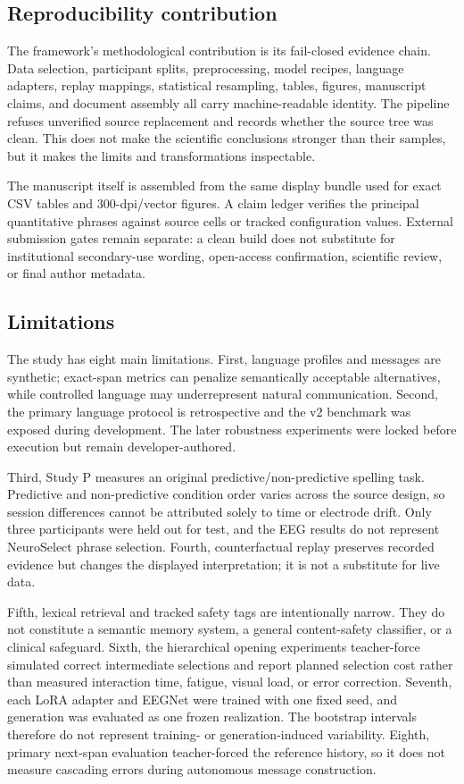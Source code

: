 \documentclass[11pt]{article}
\begin{document}
\subsection{Reproducibility contribution}

The framework's methodological contribution is its fail-closed evidence chain. Data selection, participant splits, preprocessing, model recipes, language adapters, replay mappings, statistical resampling, tables, figures, manuscript claims, and document assembly all carry machine-readable identity. The pipeline refuses unverified source replacement and records whether the source tree was clean. This does not make the scientific conclusions stronger than their samples, but it makes the limits and transformations inspectable.


The manuscript itself is assembled from the same display bundle used for exact CSV tables and 300-dpi/vector figures. A claim ledger verifies the principal quantitative phrases against source cells or tracked configuration values. External submission gates remain separate: a clean build does not substitute for institutional secondary-use wording, open-access confirmation, scientific review, or final author metadata.


\subsection{Limitations}

The study has eight main limitations. First, language profiles and messages are synthetic; exact-span metrics can penalize semantically acceptable alternatives, while controlled language may underrepresent natural communication. Second, the primary language protocol is retrospective and the v2 benchmark was exposed during development. The later robustness experiments were locked before execution but remain developer-authored.


Third, Study P measures an original predictive/non-predictive spelling task. Predictive and non-predictive condition order varies across the source design, so session differences cannot be attributed solely to time or electrode drift. Only three participants were held out for test, and the EEG results do not represent NeuroSelect phrase selection. Fourth, counterfactual replay preserves recorded evidence but changes the displayed interpretation; it is not a substitute for live data.


Fifth, lexical retrieval and tracked safety tags are intentionally narrow. They do not constitute a semantic memory system, a general content-safety classifier, or a clinical safeguard. Sixth, the hierarchical opening experiments teacher-force simulated correct intermediate selections and report planned selection cost rather than measured interaction time, fatigue, visual load, or error correction. Seventh, each LoRA adapter and EEGNet were trained with one fixed seed, and generation was evaluated as one frozen realization. The bootstrap intervals therefore do not represent training- or generation-induced variability. Eighth, primary next-span evaluation teacher-forced the reference history, so it does not measure cascading errors during autonomous message construction.
\end{document}
